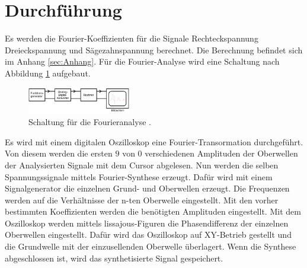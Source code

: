 \section{Durchführung}
\label{sec:Durchführung}
Es werden die Fourier-Koeffizienten für die Signale Rechteckspannung
Dreieckspannung und Sägezahnspannung berechnet. Die Berechnung befindet sich im
Anhang \ref{sec:Anhang}.
Für die Fourier-Analyse wird eine Schaltung nach Abbildung \ref{fig:Analyseschaltung} aufgebaut.
\begin{figure}
  \centering
  \includegraphics[width=0.4\textwidth]{Analyseschaltung.png}
  \caption{Schaltung für die Fourieranalyse \cite{sample}.}
  \label{fig:Analyseschaltung}
\end{figure}
Es wird mit einem digitalen Oszilloskop eine Fourier-Transormation durchgeführt.
Von diesem werden die ersten $9$ von $0$ verschiedenen Amplituden der Oberwellen
der Analysierten Signale mit dem Cursor abgelesen.
Nun werden die selben Spannungssignale mittels Fourier-Synthese erzeugt. Dafür
wird mit einem Signalgenerator die einzelnen Grund- und Oberwellen erzeugt. Die
Frequenzen werden auf die Verhältnisse der n-ten Oberwelle eingestellt.
Mit den vorher bestimmten Koeffizienten werden die benötigten Amplituden
eingestellt. Mit dem Oszilloskop werden mittels lissajous-Figuren die
Phasendifferenz der einzelnen Oberwellen eingestellt. Dafür wird das Oszilloskop
auf XY-Betrieb gestellt und die Grundwelle mit der einzusellenden Oberwelle
überlagert. Wenn die Synthese abgeschlossen ist, wird das synthetisierte Signal
gespeichert.
